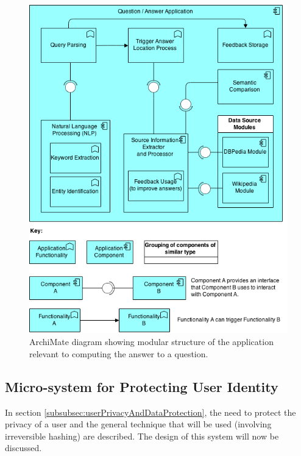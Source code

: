 \documentclass[authoryearcitations]{UoYCSproject}
\begin{document}
\begin{figure}[htb] 
\includegraphics[width=\linewidth]{systemArchitecture}
\caption{ArchiMate diagram showing modular structure of the application relevant to computing the answer to a question.}
\label{fig:systemArchitecture}
\end{figure}


\subsection{Micro-system for Protecting User Identity}
\label{subsec:hashingUserId}

In section \ref{subsubsec:userPrivacyAndDataProtection}, the need to protect the privacy of a user and the general technique that will be used (involving irreversible hashing) are described.  The design of this system will now be discussed.
\end{document}

